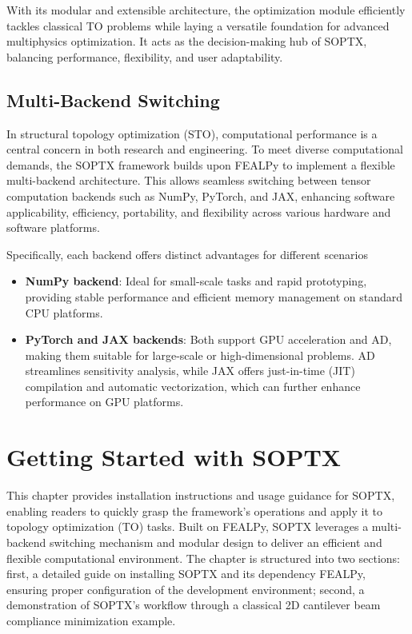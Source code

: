 \documentclass[mathpazo]{cicp}
\begin{document}
With its modular and extensible architecture, the optimization module efficiently tackles classical TO problems while laying a versatile foundation for advanced multiphysics optimization. It acts as the decision-making hub of SOPTX, balancing performance, flexibility, and user adaptability.

\subsection{Multi-Backend Switching}
In structural topology optimization (STO), computational performance is a central concern in both research and engineering. To meet diverse computational demands, the SOPTX framework builds upon FEALPy to implement a flexible multi-backend architecture. This allows seamless switching between tensor computation backends such as NumPy, PyTorch, and JAX, enhancing software applicability, efficiency, portability, and flexibility across various hardware and software platforms.

Specifically, each backend offers distinct advantages for different scenarios
\vspace{-0.5ex} %
\begin{itemize} 
	\item \textbf{NumPy backend}: Ideal for small-scale tasks and rapid prototyping, providing stable performance and efficient memory management on standard CPU platforms.
	\item \textbf{PyTorch and JAX backends}: Both support GPU acceleration and AD, making them suitable for large-scale or high-dimensional problems. AD streamlines sensitivity analysis, while JAX offers just-in-time (JIT) compilation and automatic vectorization, which can further enhance performance on GPU platforms.
\end{itemize}
\vspace{-0.5ex} %

\section{Getting Started with SOPTX}
This chapter provides installation instructions and usage guidance for SOPTX, enabling readers to quickly grasp the framework's operations and apply it to topology optimization (TO) tasks. Built on FEALPy, SOPTX leverages a multi-backend switching mechanism and modular design to deliver an efficient and flexible computational environment. The chapter is structured into two sections: first, a detailed guide on installing SOPTX and its dependency FEALPy, ensuring proper configuration of the development environment; second, a demonstration of SOPTX's workflow through a classical 2D cantilever beam compliance minimization example.
\end{document}
